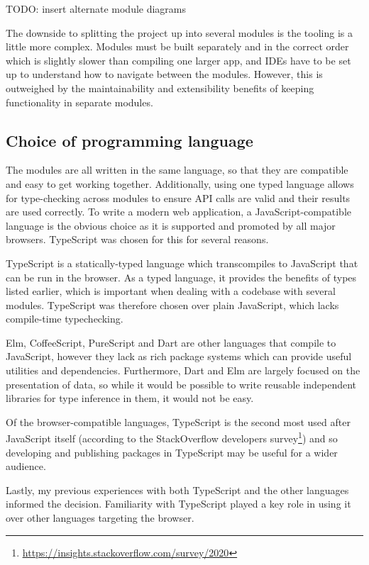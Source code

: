 \documentclass[a4paper,fleqn,oneside,12pt]{report}
\begin{document}
TODO: insert alternate module diagrams

The downside to splitting the project up into several modules is the tooling is a little more complex. Modules must be built separately and in the correct order which is slightly slower than compiling one larger app, and IDEs have to be set up to understand how to navigate between the modules. However, this is outweighed by the maintainability and extensibility benefits of keeping functionality in separate modules.

\subsection{Choice of programming language}\label{id:h.dj2rwwqr30vu}

The modules are all written in the same language, so that they are compatible and easy to get working together. Additionally, using one typed language allows for type-checking across modules to ensure API calls are valid and their results are used correctly. To write a modern web application, a JavaScript-compatible language is the obvious choice as it is supported and promoted by all major browsers. TypeScript was chosen for this for several reasons.

TypeScript is a statically-typed language which transcompiles to JavaScript that can be run in the browser. As a typed language, it provides the benefits of types listed earlier, which is important when dealing with a codebase with several modules. TypeScript was therefore chosen over plain JavaScript, which lacks compile-time typechecking.

Elm, CoffeeScript, PureScript and Dart are other languages that compile to JavaScript, however they lack as rich package systems which can provide useful utilities and dependencies. Furthermore, Dart and Elm are largely focused on the presentation of data, so while it would be possible to write reusable independent libraries for type inference in them, it would not be easy.

Of the browser-compatible languages, TypeScript is the second most used after JavaScript itself (according to the StackOverflow developers survey\footnote{\underline{\href{https://insights.stackoverflow.com/survey/2020\#technology-programming-scripting-and-markup-languages}{https://insights.stackoverflow.com/survey/2020}}}) and so developing and publishing packages in TypeScript may be useful for a wider audience.

Lastly, my previous experiences with both TypeScript and the other languages informed the decision. Familiarity with TypeScript played a key role in using it over other languages targeting the browser.
\end{document}

